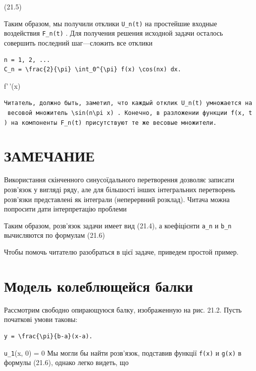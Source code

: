 \documentclass[
  ukrainian,
]{article}
\begin{document}
(21.5)

Таким образом, мы получили отклики \texttt{U\_n(t)} на простейшие
входные воздействия \texttt{F\_n(t)} . Для получения решения исходной
задачи осталось совершить последний шаг---сложить все отклики

\begin{verbatim}
n = 1, 2, ...
C_n = \frac{2}{\pi} \int_0^{\pi} f(x) \cos(nx) dx.
\end{verbatim}

f'\,'(x)

\texttt{Читатель,\ должно\ быть,\ заметил,\ что\ каждый\ отклик\ \textquotesingle{}U\_n(t)\textquotesingle{}\ умножается\ на\ весовой\ множитель\ \textquotesingle{}\textbackslash{}sin(n\textbackslash{}pi\ x)\textquotesingle{}\ .\ Конечно,\ в\ разложении\ функции\ \textquotesingle{}f(x,\ t)\textquotesingle{}\ на\ компоненты\ \textquotesingle{}F\_n(t)\textquotesingle{}\ присутствуют\ те\ же\ весовые\ множители.}

\section{ЗАМЕЧАНИЕ}\label{ux437ux430ux43cux435ux447ux430ux43dux438ux435}

Використання скінченного синусоїдального перетворення дозволяє записати
розв'язок у вигляді ряду, але для більшості інших інтегральних
перетворень розв'язки представлені як інтеграли (неперервний розклад).
Читача можна попросити дати інтерпретацію проблеми

Таким образом, розв'язок задачи имеет вид (21.4), а коефіцієнти
\texttt{a\_n} и \texttt{b\_n} вычисляются по формулам (21.6)

Чтобы помочь читателю разобраться в цієї задаче, приведем простой
пример.

\section{Модель колеблющейся
балки}\label{ux43cux43eux434ux435ux43bux44c-ux43aux43eux43bux435ux431ux43bux44eux449ux435ux439ux441ux44f-ux431ux430ux43bux43aux438}

Рассмотрим свободно опирающуюся балку, изображенную на рис. 21.2. Пусть
початкові умови таковы:

\begin{verbatim}
y = \frac{\pi}{b-a}(x-a).
\end{verbatim}

\texttt{u\_1}(x, 0) = 0 Мы могли бы найти розв'язок, подставив функції
\texttt{f(x)} и \texttt{g(x)} в формулы (21.6), однако легко видеть, що
\end{document}
